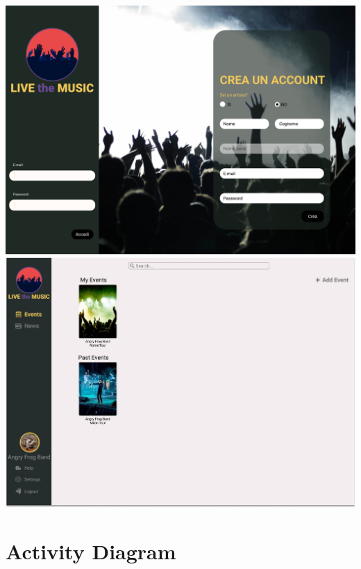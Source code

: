 \documentclass[11pt,a4paper]{article}
\begin{document}
\begin{itemize}
\includegraphics[scale=0.25]{Login.jpg}
\includegraphics[scale=0.25]{AddEvent.jpg}
\section{Activity Diagram}


\end{itemize}
\end{document}
